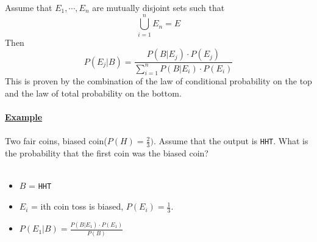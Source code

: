 \documentclass[12pt]{article}
\newcommand{\aside}[1]{\noindent\textbf{\underline{#1}}}
\begin{document}
Assume that $E_1, \cdots, E_n$ are mutually disjoint sets such that \[\bigcup \limits_{i=1}^{n} E_n = E\]Then \[P(E_j | B) = \frac{P(B | E_j) \cdot P(E_j)}{\sum \limits_{i=1}^{n} P(B | E_i) \cdot P(E_i)}\]This is proven by the combination of the law of conditional probability on the top and the law of total probability on the bottom.
\\ \\

\aside{Example}
\\ \\
Two fair coins, biased coin($P(H) = \frac{2}{3})$.  Assume that the output is \texttt{HHT}. What is the probability that the first coin was the biased coin?
\\ \\
\begin{itemize}
\item $B$ = \texttt{HHT}
\item $E_i$ = ith coin toss is biased, $P(E_i) = \frac{1}{3}$.
\item $P(E_1 | B) = \frac{P(B | E_1) \cdot P(E_1)}{P(B)}$

\end{itemize}
\end{document}
